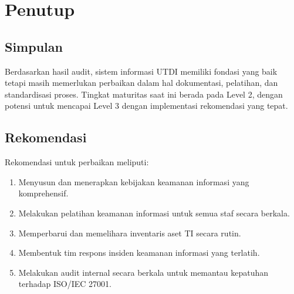 \documentclass[12pt, a4paper]{report}
\begin{document}
\chapter{Penutup}
\label{bab:penutup}

\section{Simpulan}
Berdasarkan hasil audit, sistem informasi UTDI memiliki fondasi yang baik tetapi masih memerlukan perbaikan dalam hal dokumentasi, pelatihan, dan standardisasi proses. Tingkat maturitas saat ini berada pada Level 2, dengan potensi untuk mencapai Level 3 dengan implementasi rekomendasi yang tepat\cite{iso27001}.

\section{Rekomendasi}
Rekomendasi untuk perbaikan meliputi:
\begin{enumerate}
    \item Menyusun dan menerapkan kebijakan keamanan informasi yang komprehensif.
    \item Melakukan pelatihan keamanan informasi untuk semua staf secara berkala.
    \item Memperbarui dan memelihara inventaris aset TI secara rutin.
    \item Membentuk tim respons insiden keamanan informasi yang terlatih.
    \item Melakukan audit internal secara berkala untuk memantau kepatuhan terhadap ISO/IEC 27001.
\end{enumerate}

\renewcommand{\bibname}{Pustaka}
% 
% 



\end{document}
